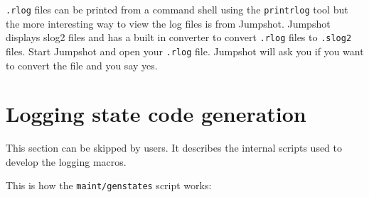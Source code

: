 \documentclass[dvipdfm,11pt]{article}
\begin{document}
\texttt{.rlog} files can be printed from a command shell using the 
\texttt{printrlog} tool but the more interesting way to view the log files 
is from Jumpshot.  Jumpshot displays slog2 files and has a built in converter 
to convert \texttt{.rlog} files to \texttt{.slog2} files.  Start Jumpshot and 
open your \texttt{.rlog} file.  Jumpshot will ask you if you want to convert
the file and you say yes.

\section{Logging state code generation}
\label{sec:genstates}

This section can be skipped by users.  It describes the internal scripts used
to develop the logging macros.

This is how the \texttt{maint/genstates} script works:
\end{document}
